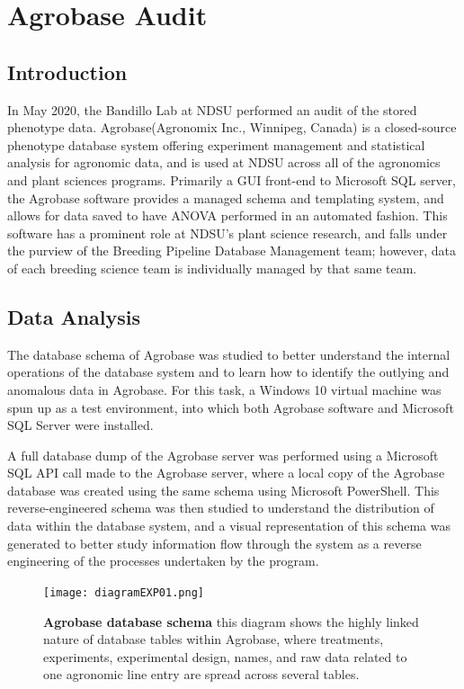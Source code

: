 \documentclass[12pt, letterpaper,oneocolumn]{article}
\begin{document}
	\section{Agrobase Audit}

	\subsection{Introduction}
	In May 2020, the Bandillo Lab at NDSU performed an audit of the stored phenotype data. Agrobase\textregistered (Agronomix Inc., Winnipeg, Canada) is a closed-source phenotype database system offering experiment management and statistical analysis for agronomic data, and is used at NDSU across all of the agronomics and plant sciences programs. Primarily a GUI front-end to Microsoft SQL server, the Agrobase software provides a managed schema and templating system, and allows for data saved to have ANOVA performed in an automated fashion. This software has a prominent role at NDSU's plant science research, and falls under the purview of the Breeding Pipeline Database Management team; however, data of each breeding science team is individually managed by that same team.

	\subsection{Data Analysis}
	The database schema of Agrobase was studied to better understand the internal operations of the database system and to learn how to identify the outlying and anomalous data in Agrobase. For this task, a Windows 10 virtual machine was spun up as a test environment, into which both Agrobase software and Microsoft SQL Server were installed.

	A full database dump of the Agrobase server was performed using a Microsoft SQL API call made to the Agrobase server, where a local copy of the Agrobase database was created using the same schema using Microsoft PowerShell. This reverse-engineered schema was then studied to understand the distribution of data within the database system, and a visual representation of this schema was generated to better study information flow through the system as a reverse engineering of the processes undertaken by the program.

\begin{center}
	\begin{figure}[H]
		\texttt{[image: diagramEXP01.png]}
		\caption{\textbf{Agrobase database schema} this diagram shows the highly linked nature of database tables within Agrobase, where treatments, experiments, experimental design, names, and raw data related to one agronomic line entry are spread across several tables.}
	\end{figure}
\end{center}
\end{document}
